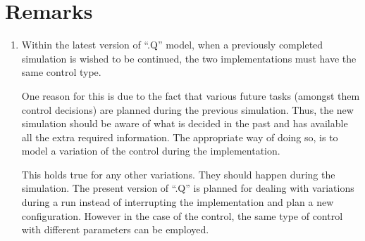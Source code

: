 
\section{Remarks}

\begin{enumerate}
\item Within the latest version of ``.Q'' model, when a previously completed simulation is wished to be continued, the two implementations must have the same control type.  

One reason for this is due to the fact that various future tasks (amongst them control decisions) are planned during the previous simulation. Thus, the new simulation should be aware of what is  decided in the past and has available all the extra required information.
The appropriate way of doing so, is to model a variation of the control during the implementation. 

This holds true for any other variations. They should happen during the simulation. 
The present version of ``.Q'' is planned for  dealing with variations during a run instead of  interrupting the implementation and plan a new configuration. 
However in the case of the control, the same type of control with different parameters can be employed.

\end{enumerate}